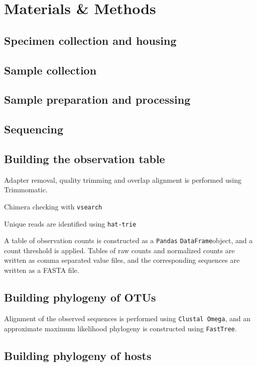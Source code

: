 \section{Materials \& Methods}

\subsection{Specimen collection and housing}

\subsection{Sample collection}

\subsection{Sample preparation and processing}

\subsection{Sequencing}

\subsection{Building the observation table}

Adapter removal, quality trimming and overlap alignment is performed using Trimmomatic.

Chimera checking with {\tt vsearch}

Unique reads are identified using {\tt hat-trie}

A table of observation counts is constructed as a {\tt Pandas} {\tt DataFrame}object, and a count threshold is applied. Tables of raw counts and normalized counts are written as comma separated value files, and the corresponding sequences are written as a FASTA file.

\subsection{Building phylogeny of OTUs}

Alignment of the observed sequences is performed using {\tt Clustal Omega}, and an approximate maximum likelihood phylogeny is constructed using {\tt FastTree}.

\subsection{Building phylogeny of hosts}

